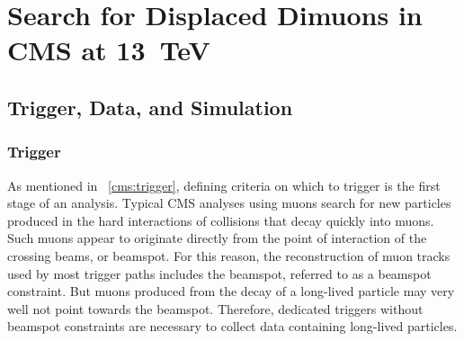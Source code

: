 \newcommand{\DSAToPAT}{DSA$\to$PAT\xspace}
\newcommand{\Code}[1]{\texttt{#1}}

\chapter{Search for Displaced Dimuons in CMS at 13~TeV}

\section{Trigger, Data, and Simulation}
\subsection{Trigger}
\label{sec:dd:trigger}
As mentioned in \Sec~\ref{cms:trigger}, defining criteria on which to trigger is the first stage of an analysis.
Typical CMS analyses using muons search for new particles produced in the hard interactions of \pp collisions that decay quickly into muons.
Such muons appear to originate directly from the point of interaction of the crossing beams, or beamspot.
For this reason, the reconstruction of muon tracks used by most trigger paths includes the beamspot, referred to as a beamspot constraint.
But muons produced from the decay of a long-lived particle may very well not point towards the beamspot.
Therefore, dedicated triggers without beamspot constraints are necessary to collect data containing long-lived particles.

